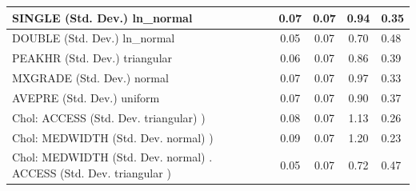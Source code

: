 \begin{table}
\begin{center}
\begin{tabular}{|l|l|c|c|c|l|}
			\hline
			SINGLE (Std. Dev.) ln_normal &  & 0.07 & 0.07 & 0.94 & 0.35 \\
			\hline
			DOUBLE (Std. Dev.) ln_normal &  & 0.05 & 0.07 & 0.70 & 0.48 \\
			\hline
			PEAKHR (Std. Dev.) triangular &  & 0.06 & 0.07 & 0.86 & 0.39 \\
			\hline
			MXGRADE (Std. Dev.) normal &  & 0.07 & 0.07 & 0.97 & 0.33 \\
			\hline
			AVEPRE (Std. Dev.) uniform &  & 0.07 & 0.07 & 0.90 & 0.37 \\
			\hline
			 Chol: ACCESS (Std. Dev. triangular) ) &  & 0.08 & 0.07 & 1.13 & 0.26 \\
			\hline
			 Chol: MEDWIDTH (Std. Dev. normal) ) &  & 0.09 & 0.07 & 1.20 & 0.23 \\
			\hline
			 Chol: MEDWIDTH (Std. Dev. normal) . ACCESS (Std. Dev.   triangular ) &  & 0.05 & 0.07 & 0.72 & 0.47 \\
			\hline
		\end{tabular}
	\end{center}
\end{table}